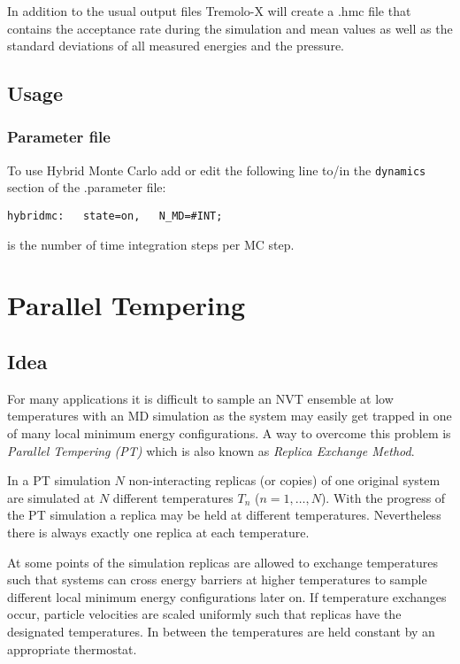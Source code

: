 In addition to the usual output files Tremolo-X will create a .hmc file that contains the acceptance rate during the simulation and mean values as well as the standard deviations of all measured energies and the pressure.

\subsection{Usage}

\subsubsection{Parameter file}

To use Hybrid Monte Carlo add or edit the following line to/in the {\tt dynamics} section of the .parameter file:

\begin{lstlisting}
hybridmc:   state=on,   N_MD=#INT;
\end{lstlisting}

 is the number of time integration steps per MC step.

\section{Parallel Tempering}
\label{paralleltempering}

\subsection{Idea}
For many applications it is difficult to sample an NVT ensemble at low temperatures with an MD simulation as the system may easily get trapped in one of many local minimum energy configurations.
A way to overcome this problem is \textit{Parallel Tempering (PT)} which is also known as \textit{Replica Exchange Method}.

In a PT simulation $N$ non-interacting replicas (or copies) of one original system are simulated at $N$ different temperatures $T_n$ ($n=1,\ldots,N$).
With the progress of the PT simulation a replica may be held at different temperatures.
Nevertheless there is always exactly one replica at each temperature.

At some points of the simulation replicas are allowed to exchange temperatures such that systems can cross energy barriers at higher temperatures to sample different local minimum energy configurations later on.
If temperature exchanges occur, particle velocities are scaled uniformly such that replicas have the designated temperatures. In between the temperatures are held constant by an appropriate thermostat.


